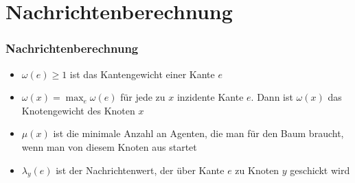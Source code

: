 \documentclass{beamer}
\begin{document}
	\section{Nachrichtenberechnung}
	
		\begin{frame}
			\frametitle{Nachrichtenberechnung}
			\large

			
			\begin{itemize}
				
				\item $\omega(e) \geq 1$ ist das Kantengewicht einer Kante $e$
								
				\item $\omega(x) = \max_{e} \omega(e)$ für jede zu $x$ inzidente Kante $e$. Dann ist $\omega(x)$ das Knotengewicht des Knoten $x$
				
				\item $\mu(x)$ ist die minimale Anzahl an Agenten, die man für den Baum braucht, wenn man von diesem Knoten aus startet
				
				\item $\lambda_{y}(e)$  ist der Nachrichtenwert, der über Kante $e$ zu Knoten $y$ geschickt wird
				
			\end{itemize}
			
		\end{frame}
	
\end{document}
